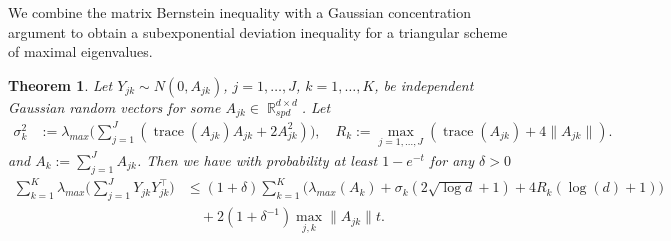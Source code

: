 \documentclass[preprint,aos]{imsart}
\numberwithin{equation}{section}
\newtheorem{theorem}[satz]{Theorem}
\theoremstyle{remark}
\DeclareMathOperator{\R}{{\mathbb R}}
\DeclareMathOperator{\PP}{{\mathbb P}}
\DeclareMathOperator{\trace}{trace}
\providecommand{\norm}[1]{\lVert #1 \rVert}
\providecommand{\bnorm}[1]{{\Bigl\lVert #1 \Bigr\rVert}}
\renewcommand{\le}{\leqslant}
\renewcommand{\ge}{\geqslant}
\begin{document}
\begin{appendix}
We combine the matrix Bernstein inequality with a Gaussian concentration argument to obtain a subexponential deviation inequality for a triangular scheme of maximal eigenvalues.

\begin{theorem}\label{ThmBernsteinTriangular}
Let $Y_{jk}\sim N(0,A_{jk})$, $j=1,\ldots,J$, $k=1,\ldots,K$, be independent Gaussian random vectors for some  $A_{jk}\in\R_{spd}^{d\times d}$. Let
\begin{align*}
\sigma_k^2 &:=\lambda_{max}\Big(\sum_{j= 1}^J(\trace(A_{jk}) A_{jk}+2A_{jk}^2)\Big),\quad
 R_k:=\max_{j=1,\ldots,J} (\trace(A_{jk})+4\norm{A_{jk}}).
\end{align*}
and $A_k:=\sum_{j=1}^JA_{jk}$. Then we have with probability at least $1-e^{-t}$ for any $\delta>0$
\begin{align*}
\sum_{k=1}^K\lambda_{max}\Big(\sum_{j=1}^J Y_{jk}Y_{jk}^\top\Big)&\le  (1+\delta)\sum_{k=1}^K\Big(\lambda_{max}(A_k)+\sigma_k(2\sqrt{\log d}+1)+4R_k(\log(d)+1)\Big)\\
&\quad + 2(1+\delta^{-1})\max_{j,k}\norm{A_{jk}} t.
\end{align*}
\begin{comment}
\begin{align*}
&\PP\Big(\sum_{k=1}^K\lambda_{max}\Big(\sum_{j\ge 1} Y_{jk}Y_{jk}^\top-A_k\Big)\ge t\Big)\le \exp\Big(-\frac{t^2}{2d\sigma^2+2Rt}\Big).
\end{align*}
In particular, for $\delta\in(0,1)$  we have  with probability at least $1-\delta$
\begin{align*}
\sum_{k=1}^K\lambda_{max}\Big(\sum_{j\ge 1} Y_{jk}Y_{jk}^\top-A_{k}\Big) &\le g\Big((2d^2+8d)\log(\delta^{-1})\Big(\sum_{k=1}^K\norm{A_{k}}\Big)^{-1}\sup_{j,k}\norm{A_{jk}}\Big)\sum_{k=1}^K\norm{A_{k}}.
\end{align*}
\end{comment}
\end{theorem}


\end{appendix}
\end{document}
